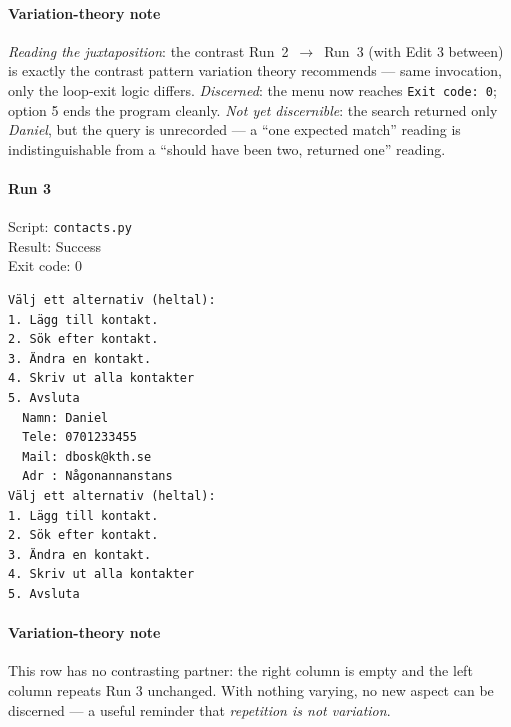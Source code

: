 \documentclass{article}
\begin{document}
\paragraph*{Variation-theory note}
\textit{Reading the juxtaposition}: the contrast Run~2~$\to$~Run~3
(with Edit 3 between) is exactly the contrast pattern variation
theory recommends --- same invocation, only the loop-exit logic
differs.
\textit{Discerned}: the menu now reaches \verb|Exit code: 0|; option 5
ends the program cleanly.
\textit{Not yet discernible}: the search returned only \emph{Daniel},
but the query is unrecorded --- a ``one expected match'' reading is
indistinguishable from a ``should have been two, returned one''
reading.

\vspace{1em}

\noindent
\begin{minipage}[t]{0.48\linewidth}
\paragraph{Run 3}
Script: \texttt{contacts.py} \\
Result: Success \\
Exit code: 0

\begin{verbatim}
Välj ett alternativ (heltal):
1. Lägg till kontakt.
2. Sök efter kontakt.
3. Ändra en kontakt.
4. Skriv ut alla kontakter
5. Avsluta
  Namn: Daniel
  Tele: 0701233455
  Mail: dbosk@kth.se
  Adr : Någonannanstans
Välj ett alternativ (heltal):
1. Lägg till kontakt.
2. Sök efter kontakt.
3. Ändra en kontakt.
4. Skriv ut alla kontakter
5. Avsluta
\end{verbatim}
\end{minipage}
\hfill
\begin{minipage}[t]{0.48\linewidth}
\end{minipage}

\paragraph*{Variation-theory note}
This row has no contrasting partner: the right column is empty and the
left column repeats Run 3 unchanged. With nothing varying, no new
aspect can be discerned --- a useful reminder that
\emph{repetition is not variation}.

\vspace{1em}
\end{document}
